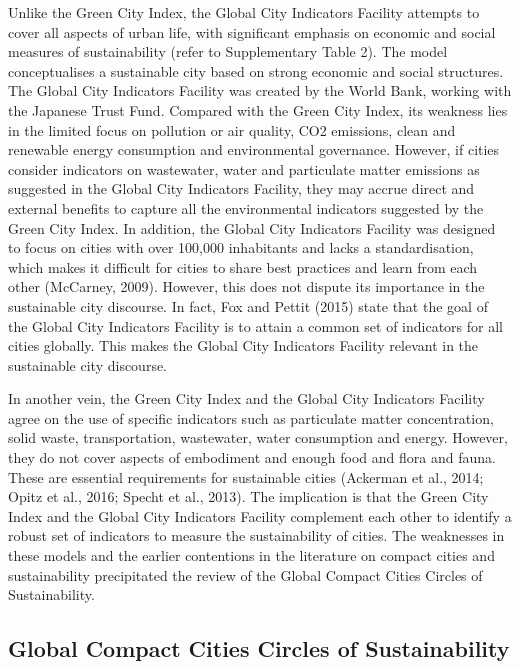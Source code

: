 Unlike the Green City Index, the Global City Indicators Facility attempts to cover all aspects of urban life, with significant emphasis on economic and social measures of sustainability (refer to Supplementary Table 2). The model conceptualises a sustainable city based on strong economic and social structures. The Global City Indicators Facility was created by the World Bank, working with the Japanese Trust Fund. Compared with the Green City Index, its weakness lies in the limited focus on pollution or air quality, CO2 emissions, clean and renewable energy consumption and environmental governance. However, if cities consider indicators on wastewater, water and particulate matter emissions as suggested in the Global City Indicators Facility, they may accrue direct and external benefits to capture all the environmental indicators suggested by the Green City Index. In addition, the Global City Indicators Facility was designed to focus on cities with over 100,000 inhabitants and lacks a standardisation, which makes it difficult for cities to share best practices and learn from each other (McCarney, 2009). However, this does not dispute its importance in the sustainable city discourse. In fact, Fox and Pettit (2015) state that the goal of the Global City Indicators Facility is to attain a common set of indicators for all cities globally. This makes the Global City Indicators Facility relevant in the sustainable city discourse.

In another vein, the Green City Index and the Global City Indicators Facility agree on the use of specific indicators such as particulate matter concentration, solid waste, transportation, wastewater, water consumption and energy. However, they do not cover aspects of embodiment and enough food and flora and fauna. These are essential requirements for sustainable cities (Ackerman et al., 2014; Opitz et al., 2016; Specht et al., 2013). The implication is that the Green City Index and the Global City Indicators Facility complement each other to identify a robust set of indicators to measure the sustainability of cities. The weaknesses in these models and the earlier contentions in the literature on compact cities and sustainability precipitated the review of the Global Compact Cities Circles of Sustainability.

\subsection{Global Compact Cities Circles of Sustainability}

